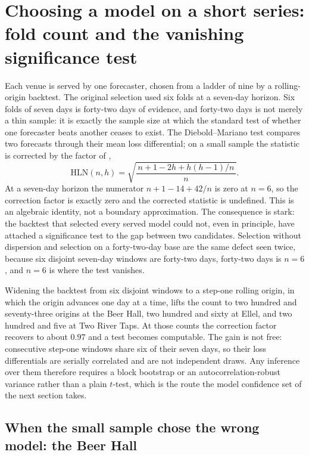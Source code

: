 \section{Choosing a model on a short series: fold count and the vanishing significance test}
\label{sec:fold-count}

Each venue is served by one forecaster, chosen from a ladder of nine by a rolling-origin
backtest. The original selection used six folds at a seven-day horizon. Six folds of seven
days is forty-two days of evidence, and forty-two days is not merely a thin sample: it is
exactly the sample size at which the standard test of whether one forecaster beats another
ceases to exist. The Diebold--Mariano test \citep{diebold_comparing_1995} compares two
forecasts through their mean loss differential; on a small sample the statistic is corrected
by the factor of \citet{harvey_testing_1997},
\[
  \mathrm{HLN}(n, h) = \sqrt{\frac{\,n + 1 - 2h + h(h-1)/n\,}{n}}.
\]
At a seven-day horizon the numerator $n + 1 - 14 + 42/n$ is zero at $n = 6$, so the
correction factor is exactly zero and the corrected statistic is undefined. This is an
algebraic identity, not a boundary approximation. The consequence is stark: the backtest that
selected every served model could not, even in principle, have attached a significance test to
the gap between two candidates. Selection without dispersion and selection on a forty-two-day
base are the same defect seen twice, because six disjoint seven-day windows are forty-two
days, forty-two days is $n = 6$, and $n = 6$ is where the test vanishes.

Widening the backtest from six disjoint windows to a step-one rolling origin, in which the
origin advances one day at a time, lifts the count to two hundred and seventy-three origins at
the Beer Hall, two hundred and sixty at Ellel, and two hundred and five at Two River Taps. At
those counts the correction factor recovers to about $0.97$ and a test becomes computable. The
gain is not free: consecutive step-one windows share six of their seven days, so their loss
differentials are serially correlated and are not independent draws. Any inference over them
therefore requires a block bootstrap or an autocorrelation-robust variance rather than a plain
$t$-test, which is the route the model confidence set of the next section takes.

\subsection{When the small sample chose the wrong model: the Beer Hall}
\label{sec:fold-count-beerhall}

